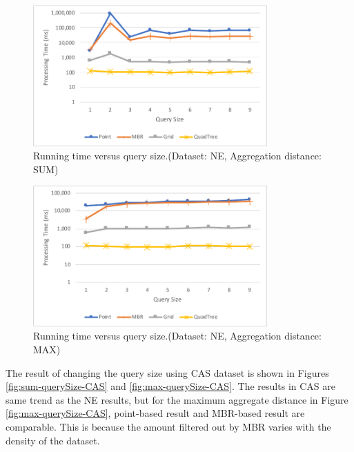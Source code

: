 \documentclass[a4paper,11pt]{report}
\theoremstyle{mytheoremstyle}
\begin{document}
\begin{figure}
    \begin{center}
        \includegraphics[width=0.8\textwidth]{src/images/NE-SUM-Q.pdf}
    \end{center}
    \caption{Running time versus query size.(Dataset: NE, Aggregation distance: SUM)}
    \label{fig:sum-querySize}
\end{figure}

\begin{figure}
    \begin{center}
        \includegraphics[width=0.8\textwidth]{src/images/NE-MAX-Q.pdf}
    \end{center}
    \caption{Running time versus query size.(Dataset: NE, Aggregation distance: MAX)}
    \label{fig:max-querySize}
\end{figure}

The result of changing the query size using CAS dataset is shown in Figures \ref{fig:sum-querySize-CAS} and  \ref{fig:max-querySize-CAS}. The results in CAS are same trend as the NE results, but for the maximum aggregate distance in Figure \ref{fig:max-querySize-CAS}, point-based result and MBR-based result are comparable. This is because the amount filtered out by MBR varies with the density of the dataset.
\end{document}
